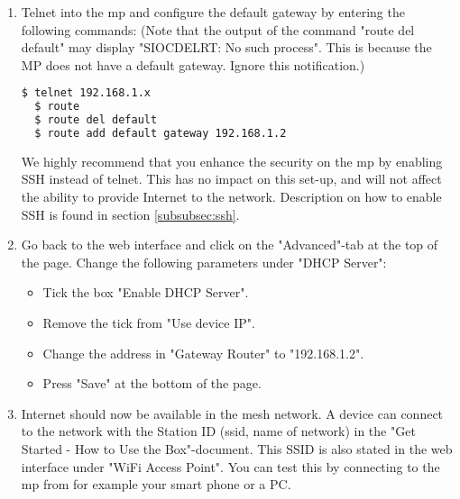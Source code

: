 \begin{enumerate}
\item Telnet into the \gls{mp} and configure the default gateway by entering the following commands: (Note that the output of the command "route del default" may display "SIOCDELRT: No such process". This is because the MP does not have a default gateway. Ignore this notification.)
\begin{lstlisting}[language=bash]
  $ telnet 192.168.1.x
  $ route 
  $ route del default 
  $ route add default gateway 192.168.1.2
\end{lstlisting} 

We highly recommend that you enhance the security on the \gls{mp} by enabling SSH instead of telnet. This has no impact on this set-up, and will not affect the ability to provide Internet to the network. Description on how to enable SSH is found in section \ref{subsubsec:ssh}.

\item Go back to the web interface and click on the "Advanced"-tab at the top of the page. Change the following parameters under "DHCP Server":
\begin{itemize}
\item Tick the box "Enable DHCP Server".
\item Remove the tick from "Use device IP".
\item Change the address in "Gateway Router" to "192.168.1.2".
\item Press "Save" at the bottom of the page. 
\end{itemize}

\item Internet should now be available in the mesh network. A device can connect to the network with the Station ID (\gls{ssid}, name of network) in the "Get Started - How to Use the Box"-document. This SSID is also stated in the web interface under "WiFi Access Point". You can test this by connecting to the \gls{mp} from for example your smart phone or a PC.
\end{enumerate}
